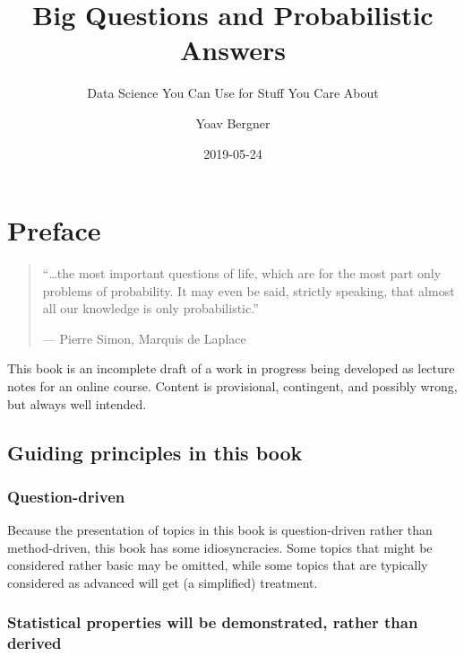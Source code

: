 \documentclass[]{book}
\title{Big Questions and Probabilistic Answers}
\subtitle{Data Science You Can Use for Stuff You Care About}
\author{Yoav Bergner}
\date{2019-05-24}
\begin{document}
\maketitle

{
\setcounter{tocdepth}{1}
\tableofcontents
}
\hypertarget{preface}{%
\chapter*{Preface}\label{preface}}

\begin{quote}
``\ldots{}the most important questions of life, which are for the most part only problems of probability. It may even be said, strictly speaking, that almost all our knowledge is only probabilistic.''

--- Pierre Simon, Marquis de Laplace
\end{quote}

This book is an incomplete draft of a work in progress being developed as lecture notes for an online course. Content is provisional, contingent, and possibly wrong, but always well intended.

\hypertarget{guiding-principles-in-this-book}{%
\section*{Guiding principles in this book}\label{guiding-principles-in-this-book}}

\hypertarget{question-driven}{%
\subsection*{Question-driven}\label{question-driven}}

Because the presentation of topics in this book is question-driven rather than method-driven, this book has some idiosyncracies. Some topics that might be considered rather basic may be omitted, while some topics that are typically considered as advanced will get (a simplified) treatment.

\hypertarget{statistical-properties-will-be-demonstrated-rather-than-derived}{%
\subsection*{Statistical properties will be demonstrated, rather than derived}\label{statistical-properties-will-be-demonstrated-rather-than-derived}}
\end{document}
